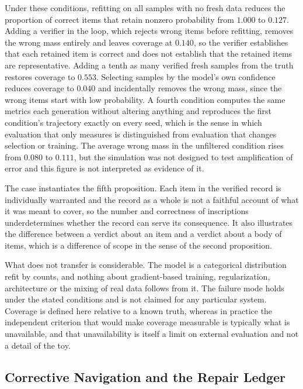 Under these conditions, refitting on all samples with no fresh data reduces the proportion of correct items that retain nonzero probability from $1.000$ to $0.127$. Adding a verifier in the loop, which rejects wrong items before refitting, removes the wrong mass entirely and leaves coverage at $0.140$, so the verifier establishes that each retained item is correct and does not establish that the retained items are representative. Adding a tenth as many verified fresh samples from the truth restores coverage to $0.553$. Selecting samples by the model's own confidence reduces coverage to $0.040$ and incidentally removes the wrong mass, since the wrong items start with low probability. A fourth condition computes the same metrics each generation without altering anything and reproduces the first condition's trajectory exactly on every seed, which is the sense in which evaluation that only measures is distinguished from evaluation that changes selection or training. The average wrong mass in the unfiltered condition rises from $0.080$ to $0.111$, but the simulation was not designed to test amplification of error and this figure is not interpreted as evidence of it.

The case instantiates the fifth proposition. Each item in the verified record is individually warranted and the record as a whole is not a faithful account of what it was meant to cover, so the number and correctness of inscriptions underdetermines whether the record can serve its consequence. It also illustrates the difference between a verdict about an item and a verdict about a body of items, which is a difference of scope in the sense of the second proposition.

What does not transfer is considerable. The model is a categorical distribution refit by counts, and nothing about gradient-based training, regularization, architecture or the mixing of real data follows from it. The failure mode holds under the stated conditions and is not claimed for any particular system. Coverage is defined here relative to a known truth, whereas in practice the independent criterion that would make coverage measurable is typically what is unavailable, and that unavailability is itself a limit on external evaluation and not a detail of the toy.

\subsection{Corrective Navigation and the Repair Ledger}

